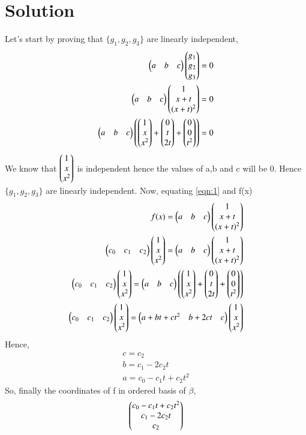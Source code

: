\documentclass[journal,12pt,twocolumn]{IEEEtran}
\begin{document}
   \section{\textbf{Solution}}
   Let's start by proving that $\{g_1,g_2,g_3\}$ are linearly independent,
   \begin{align}
   \begin{pmatrix}a&b&c\end{pmatrix}\begin{pmatrix}g_1\\g_2\\g_3\end{pmatrix}=0\\
   \begin{pmatrix}a&b&c\end{pmatrix}\begin{pmatrix}1\\x+t\\(x+t)^2\end{pmatrix}=0\label{eqn:1}\\
   \begin{pmatrix}a&b&c\end{pmatrix}\left(\begin{pmatrix}1\\x\\x^2\end{pmatrix}+\begin{pmatrix}0\\t\\2t\end{pmatrix}+\begin{pmatrix}0\\0\\t^2\end{pmatrix}\right)=0\\
   \end{align}
   We know that $\begin{pmatrix}1\\x\\x^2\end{pmatrix}$ is independent hence the values of a,b and c will be 0. Hence $\{g_1,g_2,g_3\}$ are linearly independent.
   Now, equating \eqref{eqn:1} and f(x)
  \begin{align}
  f(x)= \begin{pmatrix}a&b&c\end{pmatrix}\begin{pmatrix}1\\x+t\\(x+t)^2\end{pmatrix}\\
\begin{pmatrix}c_0&c_1&c_2\end{pmatrix}\begin{pmatrix}1\\x\\x^2\end{pmatrix}=\begin{pmatrix}a&b&c\end{pmatrix}\begin{pmatrix}1\\x+t\\(x+t)^2\end{pmatrix}\\
\begin{pmatrix}c_0&c_1&c_2\end{pmatrix}\begin{pmatrix}1\\x\\x^2\end{pmatrix}=\begin{pmatrix}a&b&c\end{pmatrix}\left(\begin{pmatrix}1\\x\\x^2\end{pmatrix}+\begin{pmatrix}0\\t\\2t\end{pmatrix}+\begin{pmatrix}0\\0\\t^2\end{pmatrix}\right)\\
\begin{pmatrix}c_0&c_1&c_2\end{pmatrix}\begin{pmatrix}1\\x\\x^2\end{pmatrix}=\begin{pmatrix}a+bt+ct^2&b+2ct&c\end{pmatrix}\begin{pmatrix}1\\x\\x^2\end{pmatrix}
  \end{align} 
  Hence,
  \begin{align}
  c=c_2\\
  b=c_1-2c_2t\\
  a=c_0-c_1t+c_2t^2
  \end{align}
  So, finally the coordinates of f in ordered basis of $\beta$,
  \begin{align}
  \begin{pmatrix}c_0-c_1t+c_2t^2\\c_1-2c_2t\\c_2\end{pmatrix}
  \end{align}
\end{document}
